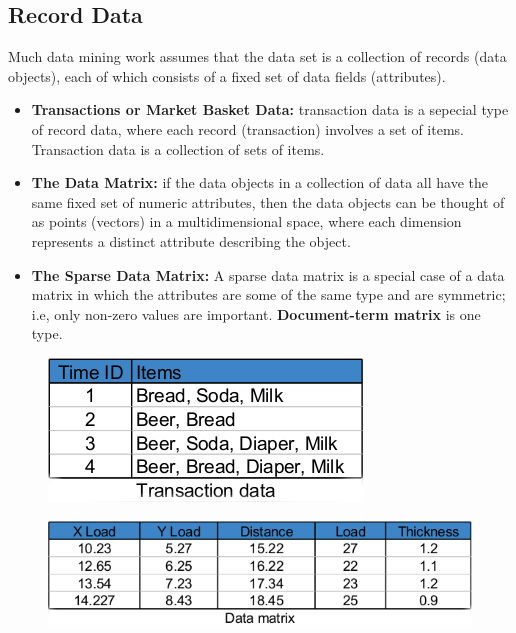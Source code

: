 		\subsection{Record Data}
		Much data mining work assumes that the data set is a collection of records (data objects), each of which consists of a fixed set of data fields (attributes).
			\begin{itemize}
				\item {\bf Transactions or Market Basket Data:} transaction data is a sepecial type of record
				data, where each record (transaction) involves a set of items. Transaction data is a collection
				of sets of items. 
				\item {\bf The Data Matrix:} if the data objects in a collection of data all have the
				same fixed set of numeric attributes, then the data objects can be thought of as points
				(vectors) in a multidimensional space, where each dimension represents a distinct attribute
				describing the object. 
				\item {\bf The Sparse Data Matrix:} A sparse data matrix is a special case of a data matrix in
				which the attributes are some of the same type and are symmetric; i.e, only non-zero values
				are important. {\bf Document-term matrix } is one type. 
			\end{itemize}

		\begin{figure}[H]
			\centering
			\includegraphics[scale=0.5]{pics/transactionData.png}
		\end{figure}

		\begin{figure}[H]
			\centering
			\includegraphics[scale=0.5]{pics/dataMatrix.png}
		\end{figure}

